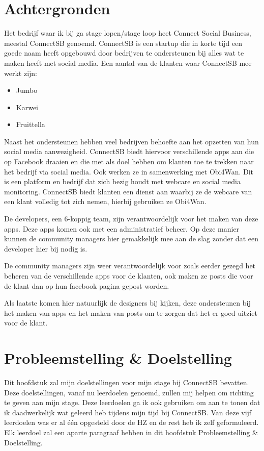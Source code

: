 \documentclass{article}
\begin{document}
\section{Achtergronden}
Het bedrijf waar ik bij ga stage lopen/stage loop heet Connect Social Business, meestal ConnectSB genoemd. ConnectSB is een startup die in korte tijd een goede naam heeft opgebouwd door bedrijven te ondersteunen bij alles wat te maken heeft met social media. Een aantal van de klanten waar ConnectSB mee werkt zijn:
\begin{itemize}
\item Jumbo
\item Karwei
\item Fruittella
\end{itemize}
Naast het ondersteunen hebben veel bedrijven behoefte aan het opzetten van hun social media aanwezigheid. ConnectSB biedt hiervoor verschillende apps aan die op Facebook draaien en die met als doel hebben om klanten toe te trekken naar het bedrijf via social media. Ook werken ze in samenwerking met Obi4Wan. Dit is een platform en bedrijf dat zich bezig houdt met webcare en social media monitoring. ConnectSB biedt klanten een dienst aan waarbij ze de webcare van een klant volledig tot zich nemen, hierbij gebruiken ze Obi4Wan.

De developers, een 6-koppig team, zijn verantwoordelijk voor het maken van deze apps. Deze apps komen ook met een administratief beheer. Op deze manier kunnen de community managers hier gemakkelijk mee aan de slag zonder dat een developer hier bij nodig is. 

De community managers zijn weer verantwoordelijk voor zoals eerder gezegd het beheren van de verschillende apps voor de klanten, ook maken ze posts die voor de klant dan op hun facebook pagina gepost worden.

Als laatste komen hier natuurlijk de designers bij kijken, deze ondersteunen bij het maken van apps en het maken van posts om te zorgen dat het er goed uitziet voor de klant.

\clearpage



\section{Probleemstelling \& Doelstelling}
Dit hoofdstuk zal mijn doelstellingen voor mijn stage bij ConnectSB bevatten. Deze doelstellingen, vanaf nu leerdoelen genoemd, zullen mij helpen om richting te geven aan mijn stage. Deze leerdoelen ga ik ook gebruiken om aan te tonen dat ik daadwerkelijk wat geleerd heb tijdens mijn tijd bij ConnectSB. Van deze vijf leerdoelen was er al één opgesteld door de HZ en de rest heb ik zelf geformuleerd.
Elk leerdoel zal een aparte paragraaf hebben in dit hoofdstuk Probleemstelling \& Doelstelling.
\end{document}
